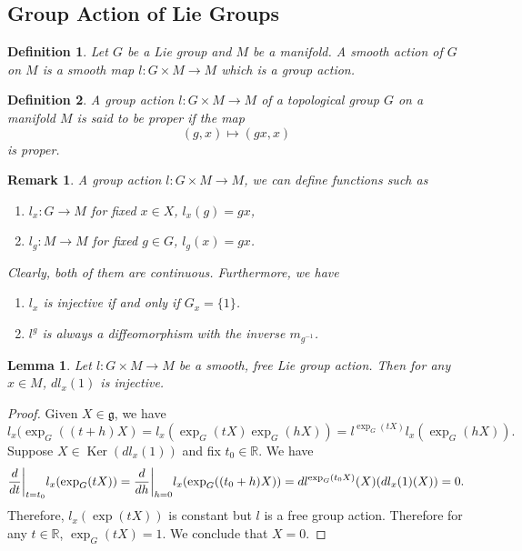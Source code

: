 \documentclass{article}
\newtheorem{definition}{Definition}[section]
\newtheorem{lemma}{Lemma}[section]
\newtheorem{remark}{Remark}[section]
\numberwithin{equation}{section}
\DeclareMathOperator{\Ker}{Ker}
\begin{document}
\subsection{Group Action of Lie Groups}

\begin{definition}
Let $G$ be a Lie group and $M$ be a manifold. A smooth action of $G$ on $M$ is a smooth map $l:G\times M\to M$ which is a group action.
\end{definition}

\begin{definition}
A group action $l:G\times M\to M$ of a topological group $G$ on a manifold $M$ is said to be proper if the map
\begin{equation*}
(g,x)\mapsto (gx,x)
\end{equation*}
is proper.
\end{definition}

\begin{remark}
A group action $l:G\times M\to M$, we can define functions such as
\begin{enumerate}[1).]
\item $l_x:G\to M$ for fixed $x\in X$, $l_x(g) = gx$,
\item $l_g:M\to M$ for fixed $g\in G$, $l_g(x) = gx$.
\end{enumerate}
Clearly, both of them are continuous. Furthermore, we have
\begin{enumerate}[1).]
\item $l_x$ is injective if and only if $G_x=\{1\}$. 
\item $l^g$ is always a diffeomorphism with the inverse $m_{g^{-1}}$.
\end{enumerate}
\end{remark}

\begin{lemma}
Let $l:G\times M\to M$ be a smooth, free Lie group action. Then for any $x\in M$, $dl_x(1)$ is injective.
\label{injective_derivative_action}
\end{lemma}

\begin{proof}
Given $X\in\mathfrak{g}$, we have
\begin{equation*}
l_x(\exp_G((t+h)X)=l_x(\exp_G(tX)\exp_G(hX)) = l^{\exp_G(tX)}l_x(\exp_G(hX)).
\end{equation*}
Suppose $X\in\Ker(dl_x(1))$ and fix $t_0\in\mathbb{R}$. We have
\begin{equation*}
{\frac d {dt}}\bigg{|}_{t=t_0}l_x(\exp_G(tX)) = {\frac d {dh}}\bigg{|}_{h=0}l_x(\exp_G((t_0+h)X)) = dl^{\exp_G(t_0X)}(X)(dl_x(1)(X))=0.%
\end{equation*} 
Therefore, $l_x(\exp(tX))$ is constant but $l$ is a free group action. Therefore for any $t\in\mathbb{R}$, $\exp_G(tX)=1$. We conclude that $X=0$. 
\end{proof}
\end{document}
